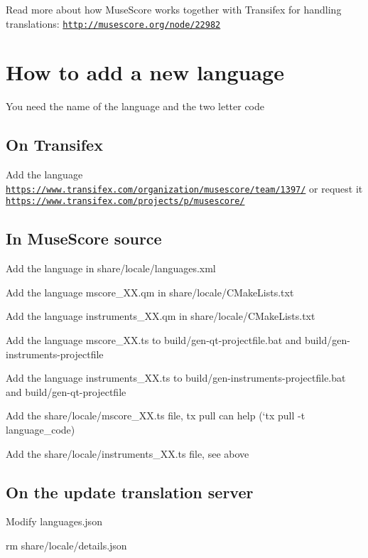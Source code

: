 Read more about how Muse\+Score works together with Transifex for handling translations\+: \href{http://musescore.org/node/22982}{\tt http\+://musescore.\+org/node/22982}

\section*{How to add a new language }

You need the name of the language and the two letter code

\subsection*{On Transifex }


\begin{DoxyItemize}
\item Add the language \href{https://www.transifex.com/organization/musescore/team/1397/}{\tt https\+://www.\+transifex.\+com/organization/musescore/team/1397/} or request it \href{https://www.transifex.com/projects/p/musescore/}{\tt https\+://www.\+transifex.\+com/projects/p/musescore/}
\end{DoxyItemize}

\subsection*{In Muse\+Score source }


\begin{DoxyItemize}
\item Add the language in share/locale/languages.\+xml
\item Add the language mscore\+\_\+\+X\+X.\+qm in share/locale/\+C\+Make\+Lists.\+txt
\item Add the language instruments\+\_\+\+X\+X.\+qm in share/locale/\+C\+Make\+Lists.\+txt
\item Add the language mscore\+\_\+\+X\+X.\+ts to build/gen-\/qt-\/projectfile.\+bat and build/gen-\/instruments-\/projectfile
\item Add the language instruments\+\_\+\+X\+X.\+ts to build/gen-\/instruments-\/projectfile.\+bat and build/gen-\/qt-\/projectfile
\item Add the share/locale/mscore\+\_\+\+X\+X.\+ts file, tx pull can help (`tx pull -\/t language\+\_\+code)
\item Add the share/locale/instruments\+\_\+\+X\+X.\+ts file, see above
\end{DoxyItemize}

\subsection*{On the update translation server }


\begin{DoxyItemize}
\item Modify languages.\+json
\item rm share/locale/details.\+json 
\end{DoxyItemize}